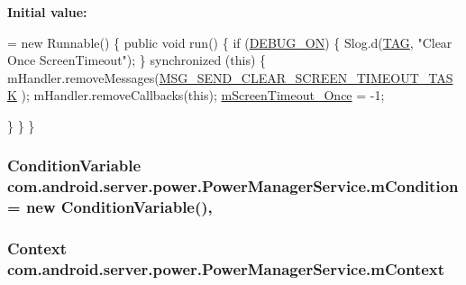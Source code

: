 {\bfseries Initial value\-:}
\begin{DoxyCode}
= \textcolor{keyword}{new} Runnable() \{
        \textcolor{keyword}{public} \textcolor{keywordtype}{void} run() \{
            \textcolor{keywordflow}{if} (\hyperlink{classcom_1_1android_1_1server_1_1power_1_1PowerManagerService_ae88b7d0affc4e24c6151967ab3fe29cd}{DEBUG\_ON}) \{
                Slog.d(\hyperlink{classcom_1_1android_1_1server_1_1power_1_1PowerManagerService_a295d19078e6db3689fe23a04e2da2cfb}{TAG}, \textcolor{stringliteral}{"Clear Once ScreenTimeout"});
            \}
            \textcolor{keyword}{synchronized} (\textcolor{keyword}{this}) \{
                mHandler.removeMessages(\hyperlink{classcom_1_1android_1_1server_1_1power_1_1PowerManagerService_a432ff8a51f91deb76a4e5eea8358a9e3}{MSG\_SEND\_CLEAR\_SCREEN\_TIMEOUT\_TASK}
      );
                mHandler.removeCallbacks(\textcolor{keyword}{this});
                \hyperlink{classcom_1_1android_1_1server_1_1power_1_1PowerManagerService_a92fc89ca04c787ef4ffae0671664dd83}{mScreenTimeout\_Once} = -1;
                
            \}
        \}
    \}
\end{DoxyCode}
\hypertarget{classcom_1_1android_1_1server_1_1power_1_1PowerManagerService_a94f4d1b811aff8658b9039c311459e12}{
\subsubsection[{m\-Condition}]{\setlength{\rightskip}{0pt plus 5cm}Condition\-Variable com.\-android.\-server.\-power.\-Power\-Manager\-Service.\-m\-Condition = new Condition\-Variable()\hspace{0.3cm}{\ttfamily [static]}, {\ttfamily [private]}}}\label{classcom_1_1android_1_1server_1_1power_1_1PowerManagerService_a94f4d1b811aff8658b9039c311459e12}
\hypertarget{classcom_1_1android_1_1server_1_1power_1_1PowerManagerService_af9124c559a6212ac027d1b51c5db72df}{
\subsubsection[{m\-Context}]{\setlength{\rightskip}{0pt plus 5cm}Context com.\-android.\-server.\-power.\-Power\-Manager\-Service.\-m\-Context\hspace{0.3cm}{\ttfamily [private]}}}\label{classcom_1_1android_1_1server_1_1power_1_1PowerManagerService_af9124c559a6212ac027d1b51c5db72df}
